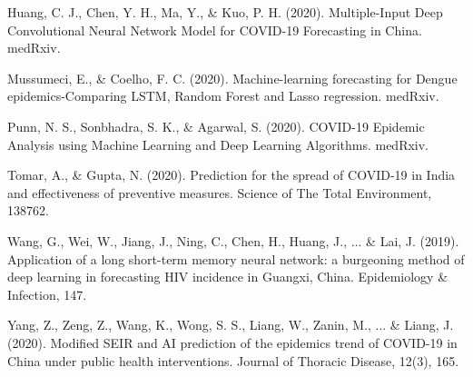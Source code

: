 ﻿\documentclass{article}
\begin{document}
\begin{multicols}{2}
\begin{thebibliography}{7}
\bibitem{}
Huang, C. J., Chen, Y. H., Ma, Y., \& Kuo, P. H. (2020). Multiple-Input Deep
Convolutional Neural Network Model for COVID-19 Forecasting in China. medRxiv.

\bibitem{}
Mussumeci, E., \& Coelho, F. C. (2020). Machine-learning forecasting for Dengue
epidemics-Comparing LSTM, Random Forest and Lasso regression. medRxiv.

\bibitem{}
Punn, N. S., Sonbhadra, S. K., \& Agarwal, S. (2020). COVID-19 Epidemic Analysis
using Machine Learning and Deep Learning Algorithms. medRxiv.

\bibitem{}
Tomar, A., \& Gupta, N. (2020). Prediction for the spread of COVID-19 in India
and effectiveness of preventive measures. Science of The Total Environment,
138762.

\bibitem{}
Wang, G., Wei, W., Jiang, J., Ning, C., Chen, H., Huang, J., ... \& Lai, J.
(2019). Application of a long short-term memory neural network: a burgeoning
method of deep learning in forecasting HIV incidence in Guangxi, China.
Epidemiology \& Infection, 147.

\bibitem{}
Yang, Z., Zeng, Z., Wang, K., Wong, S. S., Liang, W., Zanin, M., ... \& Liang, J.
(2020). Modified SEIR and AI prediction of the epidemics trend of COVID-19 in
China under public health interventions. Journal of Thoracic Disease, 12(3),
165.

\end{thebibliography}

\end{multicols}
\end{document}
